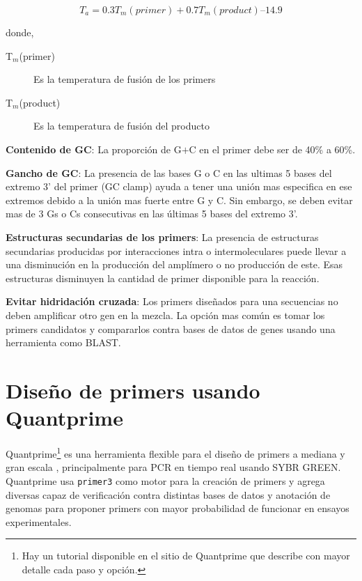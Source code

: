 \documentclass[letter,11pt]{book}
\begin{document}
\begin{equation}
T_a = 0.3  T_m(primer) + 0.7 T_m (product) – 14.9
\end{equation}

donde,

\begin{description}
\item[T$_m$(primer)]  Es la temperatura de fusión de los primers
\item[T$_m$(product)] Es la temperatura de fusión del producto
\end{description}

\textbf{Contenido de GC}: La proporción de G$+$C en el primer debe ser de 40\% a 60\%.

\textbf{Gancho de GC}: La presencia de las bases G o C en las ultimas 5 bases del extremo 3' del primer (GC clamp) ayuda a tener una unión mas especifica en ese extremos debido a la unión mas fuerte entre G  y C. Sin embargo, se deben evitar mas de 3 Gs o Cs consecutivas en las últimas 5 bases del extremo 3'.

\textbf{Estructuras secundarias de los primers}: La presencia de estructuras secundarias producidas por interacciones intra o intermoleculares puede llevar a una disminución en la producción del amplímero o no producción de este. Esas estructuras disminuyen la cantidad de primer disponible para la reacción.

\textbf{Evitar hidridación cruzada}: Los primers diseñados para una secuencias no deben amplificar otro gen en la mezcla. La opción mas común es tomar los primers candidatos y compararlos contra bases de datos de genes usando una herramienta como BLAST.

\section{Diseño de primers usando Quantprime}

{\sc Quantprime}\footnote{Hay un tutorial disponible en el sitio de {\sc Quantprime} que describe con mayor detalle cada paso y opción.} es una herramienta flexible para el diseño de primers a mediana y gran escala \citep{Arvidsson2008}, principalmente para PCR en tiempo real usando SYBR GREEN. {\sc Quantprime} usa \Verb+primer3+ \citep{Rozen2000}  como motor para la creación de primers y agrega diversas capaz de verificación contra distintas bases de datos y anotación de genomas para proponer primers con mayor probabilidad de funcionar en ensayos experimentales.
\end{document}
